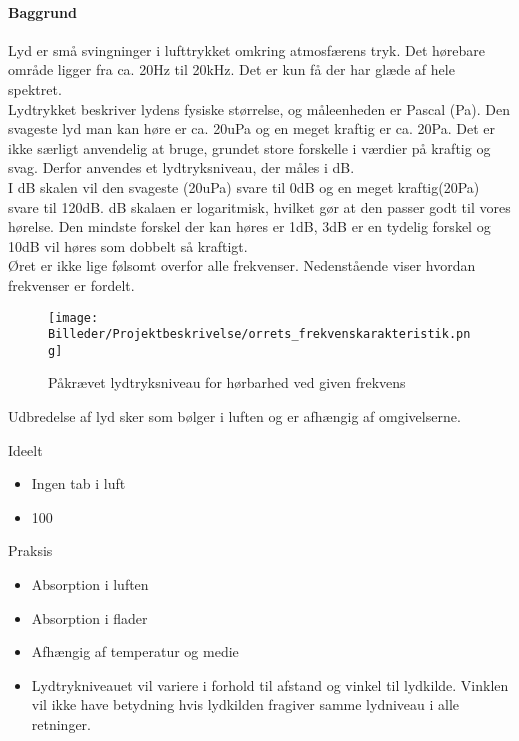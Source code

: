 \paragraph{Baggrund}
\label{chap:baggrund}

Lyd er små svingninger i lufttrykket omkring atmosfærens tryk. Det hørebare område ligger fra ca. 20Hz til 20kHz. Det er kun få der har glæde af hele spektret.\\
Lydtrykket beskriver lydens fysiske størrelse, og måleenheden er Pascal (Pa). Den svageste lyd man kan høre er ca. 20uPa og en meget kraftig er ca. 20Pa. Det er ikke særligt anvendelig at bruge, grundet store forskelle i værdier på kraftig og svag. Derfor anvendes et lydtryksniveau, der måles i dB.\\
I dB skalen vil den svageste (20uPa) svare til 0dB og en meget kraftig(20Pa) svare til 120dB. dB skalaen er logaritmisk, hvilket gør at den passer godt til vores hørelse. Den mindste forskel der kan høres er 1dB, 3dB er en tydelig forskel og 10dB vil høres som dobbelt så kraftigt.\\

Øret er ikke lige følsomt overfor alle frekvenser. Nedenstående viser hvordan frekvenser er fordelt.

\begin{figure}[h!]
  \centering
    \texttt{[image: Billeder/Projektbeskrivelse/orrets\_frekvenskarakteristik.png]}
    \caption{Påkrævet lydtryksniveau for hørbarhed ved given frekvens}
\end{figure}\medskip
 
Udbredelse af lyd sker som bølger i luften og er afhængig af omgivelserne.

Ideelt
\begin{itemize}
\item Ingen tab i luft
\item 100 %
\end{itemize}

Praksis
\begin{itemize}
\item Absorption i luften
\item Absorption i flader
\item Afhængig af temperatur og medie
\item Lydtrykniveauet vil variere i forhold til afstand og vinkel til lydkilde. Vinklen vil ikke have betydning hvis lydkilden fragiver samme lydniveau i alle retninger.
\end{itemize}\medskip

